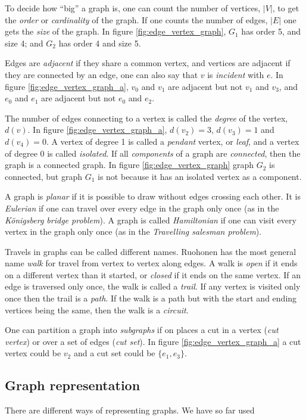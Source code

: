 \documentclass[../main.tex]{subfiles}
\begin{document}
To decide how ``big'' a graph is, one can count the number of vertices, $|V|$, to get the \emph{order} or \emph{cardinality} of the graph. If one counts the number of edges, $|E|$ one gets the \emph{size} of the graph. In figure \ref{fig:edge_vertex_graph}, $G_1$ has order 5, and size 4; and $G_2$ has order 4 and size 5.

Edges are \emph{adjacent} if they share a common vertex, and vertices are adjacent if they are connected by an edge, one can also say that $v$ is \emph{incident} with $e$. In figure \ref{fig:edge_vertex_graph_a}, $v_0$ and $v_1$ are adjacent but not $v_1$ and $v_3$, and $e_0$ and $e_1$ are adjacent but not $e_0$ and $e_2$. 

The number of edges connecting to a vertex is called the \emph{degree} of the vertex, $d(v)$. In figure \ref{fig:edge_vertex_graph_a}, $d(v_2) = 3$, $d(v_3) = 1$ and $d(v_4) = 0$. A vertex of degree 1 is called a \emph{pendant} vertex, or \emph{leaf}, and a vertex of degree 0 is called \emph{isolated}. If all \emph{components} of a graph are \emph{connected}, then the graph is a connected graph. In figure \ref{fig:edge_vertex_graph} graph $G_2$ is connected, but graph $G_1$ is not because it has an isolated vertex as a component.

A graph is \emph{planar} if it is possible to draw without edges crossing each other. It is \emph{Eulerian} if one can travel over every edge in the graph only once (as in the \emph{Königsberg bridge problem}). A graph is called \emph{Hamiltonian} if one can visit every vertex in the graph only once (as in the \emph{Travelling salesman problem}).

Travels in graphs can be called different names. Ruohonen \cite{ruohonen-graph-theory} has the most general name \emph{walk} for travel from vertex to vertex along edges. A walk is \emph{open} if it ends on a different vertex than it started, or \emph{closed} if it ends on the same vertex. If an edge is traversed only once, the walk is called a \emph{trail}. If any vertex is visited only once then the trail is a \emph{path}. If the walk is a path but with the start and ending vertices being the same, then the walk is a \emph{circuit}.

One can partition a graph into \emph{subgraphs} if on places a cut in a vertex (\emph{cut vertex}) or over a set of edges (\emph{cut set}). In figure \ref{fig:edge_vertex_graph_a} a cut vertex could be $v_2$ and a cut set could be $\{e_1, e_3\}$.


\subsection{Graph representation} \label{graph_representations}
There are different ways of representing graphs. We have so far used
\end{document}
